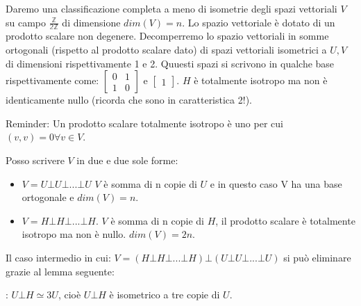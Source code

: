 

Daremo una classificazione completa a meno di isometrie degli spazi vettoriali $V$ su campo $\frac{\mathbb{Z}}{\mathbb{2Z}}$ di dimensione 
$dim(V) = n$. Lo spazio vettoriale è dotato di un prodotto scalare non degenere.
Decomperremo lo spazio vettoriali in somme ortogonali (rispetto al prodotto scalare dato) di spazi vettoriali isometrici
a $U, V$ di dimensioni rispettivamente 1 e 2. Quuesti spazi si scrivono in qualche base rispettivamente come: $ \left[\begin{matrix} 0 & 1 \\ 1 & 0 \end{matrix}\right]$
e $\left[\begin{matrix} 1 \end{matrix}\right]$.
$H$ è totalmente isotropo ma non è identicamente nullo (ricorda che sono in caratteristica 2!).

Reminder: Un prodotto scalare totalmente isotropo è uno per cui $(v,v) = 0 \forall v \in V$.

\begin{teo}
 Posso scrivere $V$ in due e due sole forme:
 \begin{itemize}
  \item $V = U \bot U \bot ... \bot U$
  $V$ è somma di n copie di $U$ e in questo caso V ha una base ortogonale e $dim(V) = n$.
  \item $V = H \bot H \bot ... \bot H$.
  $V$ è somma di n copie di $H$, il prodotto scalare è totalmente isotropo ma non è nullo. $dim(V) = 2n$.
 \end{itemize}
\end{teo}

Il caso intermedio in cui:  $V = (H \bot H \bot ... \bot H) \bot (U \bot U \bot ... \bot U)$ si può eliminare grazie al lemma seguente:

\begin{lemma}:
 $U \bot H \simeq 3U$, cioè $U \bot H$ è isometrico a tre copie di $U$.
\end{lemma}

